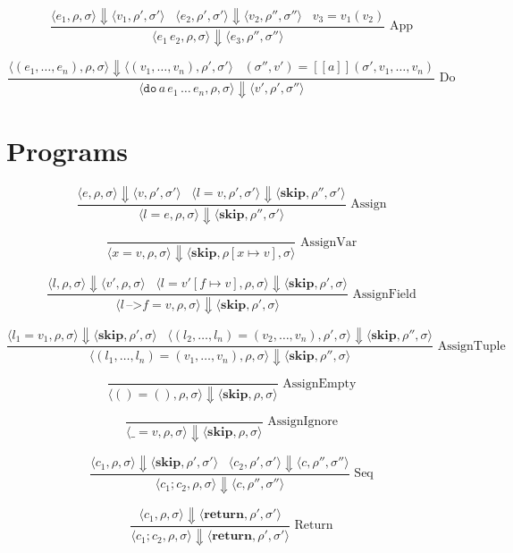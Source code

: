 \documentclass[a4paper]{article}
\newcommand{\cskip}{\textbf{skip}}
\newcommand{\cret}{\textbf{return}}
\newcommand{\mem}{\rho}
\newcommand{\glob}{\sigma}
\newcommand{\bkt}[1]{\langle #1\rangle}
\newcommand{\intp}[1]{[\![#1]\!]}
\newcommand{\eval}{\Downarrow}
\newcommand{\also}{\,\,\,\,\,}
\newcommand{\semrule}[3]{\[\dfrac{#2}{#3}\,\,\text{#1}\]}
\begin{document}
\semrule{App}
{\bkt{e_1,\mem,\glob} \eval \bkt{v_1,\mem',\glob'}
\also \bkt{e_2,\mem',\glob'} \eval \bkt{v_2,\mem'',\glob''}
\also v_3 = v_1(v_2)}
{\bkt{e_1\,e_2,\mem,\glob} \eval \bkt{e_3,\mem'',\glob''}}

\semrule{Do}
{\bkt{(e_1,\ldots,e_n),\mem,\glob} \eval \bkt{(v_1,\ldots,v_n),\mem',\glob'}
\also (\glob'',v') = \intp{a}(\glob',v_1,\ldots,v_n)}
{\bkt{\texttt{do}\,a\,e_1\,\ldots\,e_n,\mem,\glob} \eval \bkt{v',\mem',\glob''}}

\section*{Programs}


\semrule{Assign}
{\bkt{e,\mem,\glob} \eval \bkt{v,\mem',\glob'}
\also \bkt{l=v,\mem',\glob'} \eval \bkt{\cskip,\mem'',\glob'}}
{\bkt{l=e,\mem,\glob} \eval \bkt{\cskip,\mem'',\glob'}}

\semrule{AssignVar}
{}
{\bkt{x=v,\mem,\glob} \eval \bkt{\cskip,\mem [ x \mapsto v ],\glob}}


\semrule{AssignField}
{\bkt{l,\mem,\glob} \eval \bkt{v',\mem,\glob}
\also \bkt{l=v' [ f \mapsto  v ],\mem,\glob} \eval \bkt{\cskip,\mem',\glob}}
{\bkt{l\,\texttt{-->}f=v,\mem,\glob} \eval \bkt{\cskip,\mem',\glob}}

\semrule{AssignTuple}
{\bkt{l_1=v_1,\mem,\glob} \eval \bkt{\cskip,\mem',\glob}
\also \bkt{(l_2,\ldots,l_n)=(v_2,\ldots,v_n),\mem',\glob} \eval \bkt{\cskip,\mem'',\glob}}
{\bkt{(l_1,\ldots,l_n)=(v_1,\ldots,v_n),\mem,\glob} \eval \bkt{\cskip,\mem'',\glob}}

\semrule{AssignEmpty}
{}
{\bkt{()=(),\mem,\glob} \eval \bkt{\cskip,\mem,\glob}}

\semrule{AssignIgnore}
{}
{\bkt{\texttt{\_}=v,\mem,\glob} \eval \bkt{\cskip,\mem,\glob}}

\semrule{Seq}
{\bkt{c_1,\mem,\glob} \eval \bkt{\cskip,\mem',\glob'}
\also \bkt{c_2,\mem',\glob'} \eval \bkt{c,\mem'',\glob''}}
{\bkt{c_1;c_2,\mem,\glob} \eval \bkt{c,\mem'',\glob''}}

\semrule{Return}
{\bkt{c_1,\mem,\glob} \eval \bkt{\cret,\mem',\glob'}}
{\bkt{c_1;c_2,\mem,\glob} \eval \bkt{\cret,\mem',\glob'}}
\end{document}
